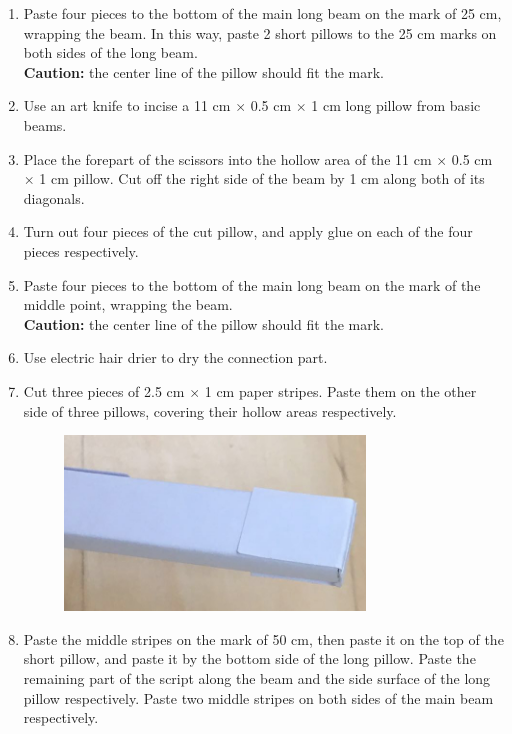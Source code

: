 \begin{enumerate}
\begin{enumerate}
	\item Paste four pieces to the bottom of the main long beam on the mark of 25 cm, wrapping the beam. In this way, paste 2 short pillows to the 25 cm marks on both sides of the long beam. 
	\\ \textbf{Caution:} the center line of the pillow should fit the mark.
	\item Use an art knife to incise a 11 cm $\times$ 0.5 cm $\times$ 1 cm long pillow from basic beams. 
	\item Place the forepart of the scissors into the hollow area of the 11 cm $\times$ 0.5 cm $\times$ 1 cm pillow. Cut off the right side of the beam by 1 cm along both of its diagonals.
	\item Turn out four pieces of the cut pillow, and apply glue on each of the four pieces respectively. 
	\item Paste four pieces to the bottom of the main long beam on the mark of the middle point, wrapping the beam. 
	\\ \textbf{Caution:} the center line of the pillow should fit the mark.
	\item Use electric hair drier to dry the connection part. 
	\item Cut three pieces of 2.5 cm $\times$ 1 cm paper stripes. Paste them on the other side of three pillows, covering their hollow areas respectively.
	\begin{figure}[H]
	\begin{center}
	\includegraphics[width=8cm]{figure/procedureBridge/p2}
	\end{center}
	\end{figure}
	\item Paste the middle stripes on the mark of 50 cm, then paste it on the top of the short pillow, and paste it by the bottom side of the long pillow. Paste the remaining part of the script along the beam and the side surface of the long pillow respectively. Paste two middle stripes on both sides of the main beam respectively. 
	\begin{figure}[H]

\end{figure}
\end{enumerate}
\end{enumerate}
